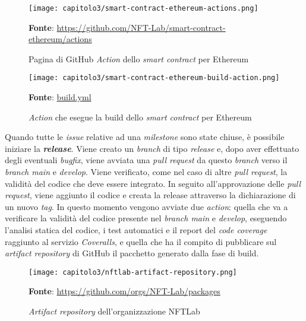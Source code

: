 \clearpage
\begin{figure}[h!]
  \centering
  \texttt{[image: capitolo3/smart-contract-ethereum-actions.png]}
  \caption{Pagina di GitHub \textit{Action} dello \textit{smart contract} per Ethereum}
  \textbf{Fonte}: \href{https://github.com/NFT-Lab/smart-contract-ethereum/actions}{https://github.com/NFT-Lab/smart-contract-ethereum/actions}
\end{figure}

\begin{figure}[h!]
  \centering
  \texttt{[image: capitolo3/smart-contract-ethereum-build-action.png]}
  \caption{\textit{Action} che esegue la build dello \textit{smart contract} per Ethereum}
  \textbf{Fonte}: \href{https://github.com/NFT-Lab/smart-contract-ethereum/blob/main/.github/workflows/build.yml}{build.yml}
\end{figure}

Quando tutte le \textit{issue} relative ad una \textit{milestone} sono state chiuse, è possibile iniziare la \textbf{\textit{release}}. Viene creato un \textit{branch} di tipo \textit{release} e, dopo aver effettuato degli eventuali \textit{bugfix}, viene avviata una \textit{pull request} da questo \textit{branch} verso il \textit{branch main} e \textit{develop}. Viene verificato, come nel caso di altre \textit{pull request}, la validità del codice che deve essere integrato. In seguito all'approvazione delle \textit{pull request}, viene aggiunto il codice e creata la release attraverso la dichiarazione di un nuovo \textit{tag}. In questo momento vengono avviate due \textit{action}: quella che va a verificare la validità del codice presente nel \textit{branch main} e \textit{develop}, eseguendo l'analisi statica del codice, i test automatici e il report del \textit{code coverage} raggiunto al servizio \textit{Coveralls}, e quella che ha il compito di pubblicare sul \textit{artifact repository} di GitHub il pacchetto generato dalla fase di build.

\begin{figure}[h!]
  \centering
  \texttt{[image: capitolo3/nftlab-artifact-repository.png]}
  \caption{\textit{Artifact repository} dell'organizzazione NFTLab}
  \textbf{Fonte}: \href{https://github.com/orgs/NFT-Lab/packages}{https://github.com/orgs/NFT-Lab/packages}
\end{figure}
